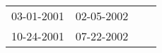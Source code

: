\begin{supertabular}{llll}
 03-01-2001 &  02-05-2002 \\
 10-24-2001 &  07-22-2002 \\
\end{supertabular}
